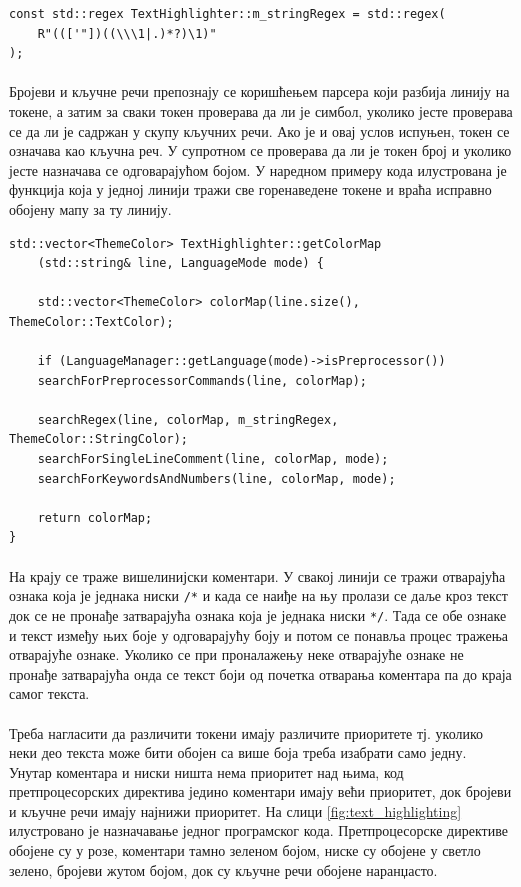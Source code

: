 \documentclass[12pt,oneside]{memoir}
\begin{document}
\begin{verbatim}
const std::regex TextHighlighter::m_stringRegex = std::regex(
	R"((['"])((\\\1|.)*?)\1)"
);
\end{verbatim}

\paragraph{}
Бројеви и кључне речи препознају се коришћењем парсера који разбија линију на токене, а затим за сваки токен проверава да ли је симбол, уколико јесте проверава се да ли је садржан у скупу кључних речи. Ако је и овај услов испуњен, токен се означава 
као кључна реч. У супротном се проверава да ли је токен број и уколико јесте
назначава се одговарајућом бојом. У наредном примеру кода илустрована је функција
која у једној линији тражи све горенаведене токене и враћа исправно обојену
мапу за ту линију.

\begin{verbatim}
std::vector<ThemeColor> TextHighlighter::getColorMap
	(std::string& line, LanguageMode mode) {
		
	std::vector<ThemeColor> colorMap(line.size(), ThemeColor::TextColor);
	
	if (LanguageManager::getLanguage(mode)->isPreprocessor())
	searchForPreprocessorCommands(line, colorMap);
	
	searchRegex(line, colorMap, m_stringRegex, ThemeColor::StringColor);
	searchForSingleLineComment(line, colorMap, mode);
	searchForKeywordsAndNumbers(line, colorMap, mode);
	
	return colorMap;
}
\end{verbatim}

\paragraph{}
На крају се траже вишелинијски коментари. У свакој линији се тражи отварајућа
ознака која је једнака ниски \verb|/*| и када се наиђе на њу пролази се даље
кроз текст док се не пронађе затварајућа ознака која је једнака ниски \verb|*/|.
Тада се обе ознаке и текст између њих боје у одговарајућу боју и потом се 
понавља процес тражења отварајуће ознаке. Уколико се при проналажењу
неке отварајуће ознаке не пронађе затварајућа онда се текст боји од почетка отварања коментара па до краја самог текста.

\paragraph{}
Треба нагласити да различити токени имају различите приоритете тј.
уколико неки део текста може бити обојен са више боја треба изабрати
само једну. Унутар коментара и ниски ништа нема приоритет над њима,
код претпроцесорских директива једино коментари имају већи приоритет,
док бројеви и кључне речи имају најнижи приоритет.
На слици \ref{fig:text_highlighting} илустровано је назначавање
једног програмског кода.  Претпроцесорске директиве обојене су у розе,
коментари тамно зеленом бојом, ниске су обојене у светло зелено, бројеви
жутом бојом, док су кључне речи обојене наранџасто.
\end{document}
